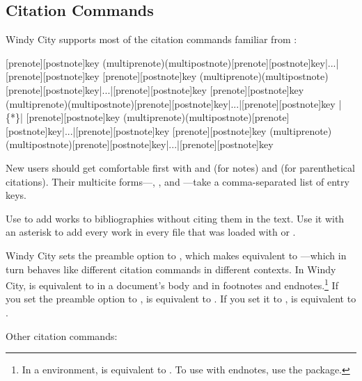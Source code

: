 \documentclass[11pt,letterpaper,oneside]{article}
\begin{document}
\subsection{Citation Commands}
\label{citecmds}

Windy City supports most of the citation commands familiar from
\biblatex:

\begin{ltxsyntax}
[prenote][postnote]{key}
(multiprenote)(multipostnote)[prenote][postnote]{key}|...|[prenote][postnote]{key}
[prenote][postnote]{key}
(multiprenote)(multipostnote)[prenote][postnote]{key}|...|[prenote][postnote]{key}
[prenote][postnote]{key}
(multiprenote)(multipostnote)[prenote][postnote]{key}|...|[prenote][postnote]{key}
 |\{*\}|
[prenote][postnote]{key}
(multiprenote)(multipostnote)[prenote][postnote]{key}|...|[prenote][postnote]{key}
[prenote][postnote]{key}
(multiprenote)(multipostnote)[prenote][postnote]{key}|...|[prenote][postnote]{key}
\end{ltxsyntax}

\noindent New users should get comfortable first with  and
 (for notes) and  (for parenthetical
citations). Their multicite forms---, , and
---take a comma-separated list of entry keys.

Use  to add works to bibliographies without citing them in
the text. Use it with an asterisk to add every work in every
 file that was loaded with  or
.

Windy City sets the  preamble option to ,
which makes  equivalent to ---which in
turn behaves like different citation commands in different contexts.
In Windy City,  is equivalent to  in a
document's body and  in footnotes and endnotes.\footnote{In
a  environment,  is equivalent to
. To use  with endnotes, use the
 package.} If you set the  preamble option
to ,  is equivalent to . If
you set it to ,  is equivalent to .

Other citation commands:
\end{document}

